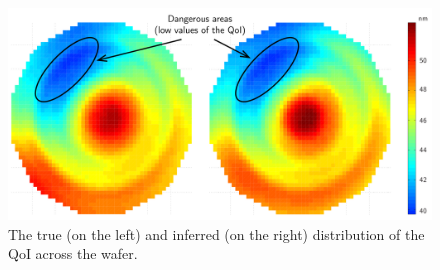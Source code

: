 \begin{figure}[b!]
  \vspace{-1.5em}
  \centering
  \includegraphics[width=1\linewidth]{include/assets/wafer-qoi.pdf}
  \caption{The true (on the left) and inferred (on the right) distribution of the QoI across the wafer.}
\end{figure}
